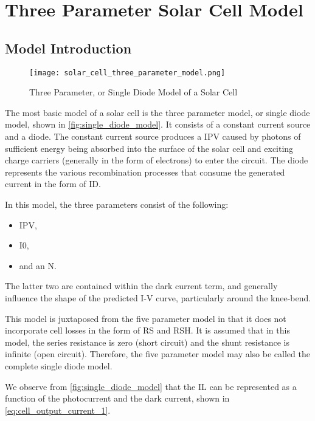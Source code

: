 \section{Three Parameter Solar Cell Model}\label{sec:three_parameter_solar_cell_model}

\subsection{Model Introduction}\label{subsec:three_param_model_introduction}

\begin{figure}[h]
    \texttt{[image: solar\_cell\_three\_parameter\_model.png]}
    \caption{Three Parameter, or Single Diode Model of a Solar Cell}
    \label{fig:single_diode_model}
\end{figure}

The most basic model of a solar cell is the three parameter model, or single
diode model, shown in \autoref{fig:single_diode_model}. It consists of a
constant current source and a diode. The constant current source produces a
\ac{IPV} caused by photons of sufficient energy being absorbed into the surface
of the solar cell and exciting charge carriers (generally in the form of
electrons) to enter the circuit. The diode represents the various recombination
processes that consume the generated current in the form of \ac{ID}.

In this model, the three parameters consist of the following:

\begin{itemize}
    \item \acf{IPV},
    \item \acf{I0},
    \item and an \acf{N}.
\end{itemize}

The latter two are contained within the dark current term, and generally
influence the shape of the predicted \ac{I-V} curve, particularly around the
knee-bend.

This model is juxtaposed from the five parameter model in that it does not
incorporate cell losses in the form of \ac{RS} and \ac{RSH}. It is assumed that
in this model, the series resistance is zero (short circuit) and the shunt
resistance is infinite (open circuit). Therefore, the five parameter model may
also be called the complete single diode model.

We observe from \autoref{fig:single_diode_model} that the \ac{IL} can be
represented as a function of the photocurrent and the dark current, shown in
\autoref{eq:cell_output_current_1}.

